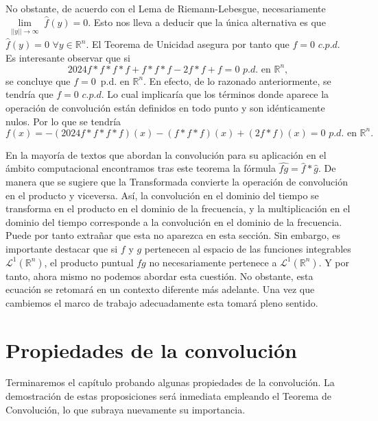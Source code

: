 \noindent No obstante, de acuerdo con el Lema de Riemann-Lebesgue, necesariamente
$\underset{\substack{||y|| \rightarrow \infty}}{\lim}\widehat{f}(y)=0.$
Esto nos lleva a deducir que la única alternativa es que  $\widehat{f}(y) = 0 \, \, \forall y \in \mathbb{R}^n$.
El Teorema de Unicidad asegura por tanto que $f=0 \, \, c.p.d$. Es interesante observar que si 
\begin{equation}\label{eq:ejemplo}
    2024f*f*f*f+f*f*f-2f*f+f = 0 \, \, p.d. \, \, \text{en}\, \, \mathbb{R}^n,
\end{equation}
se concluye que  $f=0 \,$ p.d. en $\mathbb{R}^n$. En efecto, de lo razonado anteriormente, se tendría que $f=0 \, \, c.p.d$. Lo cual implicaría que los términos donde aparece la operación de convolución están definidos en todo punto y son idénticamente nulos. Por lo que  se tendría 
\begin{equation}
    f(x) = -(2024f*f*f*f)(x)-(f*f*f)(x)+(2f*f)(x) = 0\, \, p.d. \, \, \text{en}\, \, \mathbb{R}^n.
\end{equation}

\begin{observacion}
En la mayoría de textos que abordan la convolución para su aplicación en el ámbito computacional encontramos tras este teorema la fórmula $\widehat{fg} = \widehat{f}*\widehat{g}$. De manera que se sugiere que la Transformada convierte la operación de convolución en el producto y viceversa. Así, la convolución en el dominio del tiempo se transforma en el producto en el dominio de la frecuencia, y la multiplicación en el dominio del tiempo corresponde a la convolución en el dominio de la frecuencia. Puede por tanto extrañar que esta no aparezca en esta sección.
Sin embargo, es importante destacar que si $f$ y $g$ pertenecen al espacio de las funciones integrables $\mathscr{L}^1(\mathbb{R}^n)$, el producto puntual $fg$ no necesariamente pertenece a $\mathscr{L}^1(\mathbb{R}^n)$.  Y por tanto, ahora mismo no podemos abordar esta cuestión. 
No obstante, esta ecuación se retomará en un contexto diferente más adelante. Una vez que cambiemos el marco de trabajo adecuadamente esta tomará pleno sentido.

\end{observacion}


\section{Propiedades de la convolución}


\noindent Terminaremos el capítulo probando algunas propiedades de la convolución. La demostración de estas proposiciones será inmediata empleando el Teorema de Convolución, lo que subraya nuevamente su importancia.

